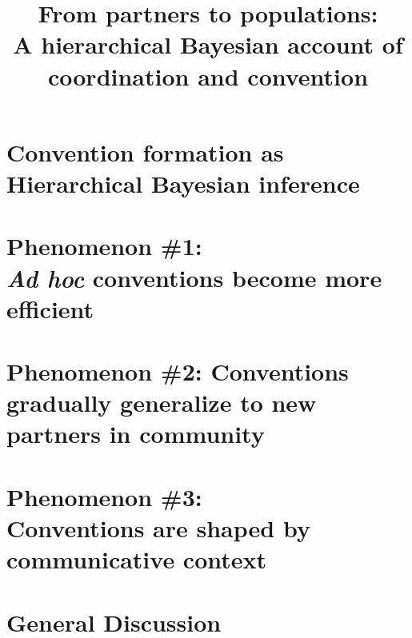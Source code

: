 \documentclass[10pt, man, floatsintext]{apa7}
\title{From partners to populations: \\[.1em] A hierarchical Bayesian account of coordination and convention}
\begin{document}
\maketitle



\section{Convention formation as \\Hierarchical Bayesian inference}



\section{Phenomenon \#1:  \\\emph{Ad hoc} conventions become more efficient}



\section{Phenomenon \#2:  Conventions gradually generalize to new partners in community}



\section{Phenomenon \#3: \\ Conventions are shaped by communicative context}



\section{General Discussion}



\small




\renewcommand{\thefigure}{A\arabic{figure}}
\renewcommand{\thetable}{A\arabic{table}}
\setcounter{table}{0}
\setcounter{figure}{0}
\end{document}
